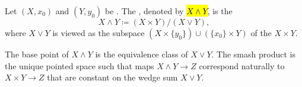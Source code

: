 \begin{definition} \label{definition:smash_product_of_pointed_topological_spaces}
    Let $(X, x_0)$ and $(Y, y_0)$ be . The , denoted by \hl{$X \wedge Y$}, is the 
    $$X \wedge Y \coloneqq (X \times Y) / (X \vee Y),$$
    where $X \vee Y$ is viewed as the subspace $(X \times \{y_0\}) \cup (\{x_0\} \times Y)$ of the  $X \times Y$. 
    
    The base point of $X \wedge Y$ is the equivalence class of $X \vee Y$. The smash product is the unique pointed space such that maps $X \wedge Y \to Z$ correspond naturally to  $X \times Y \to Z$ that are constant on the wedge sum $X \vee Y$.
\end{definition}